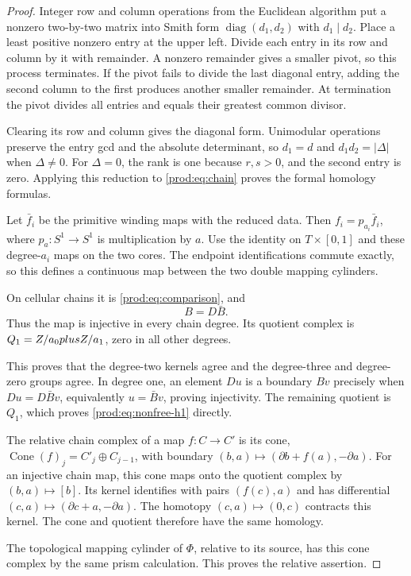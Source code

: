 \begin{proof}
Integer row and column operations from the Euclidean algorithm put a
nonzero two-by-two matrix into Smith form
$\operatorname{diag}(d_1,d_2)$ with $d_1\mid d_2$.
Place a least positive nonzero entry at the upper left.
Divide each entry in its row and column by it with remainder.
A nonzero remainder gives a smaller pivot, so this process terminates.
If the pivot fails to divide the last diagonal entry, adding the second
column to the first produces another smaller remainder.
At termination the pivot divides all entries and equals their greatest
common divisor.

Clearing its row and column gives the diagonal form.
Unimodular operations preserve the entry gcd and the absolute determinant,
so $d_1=d$ and $d_1d_2=|\Delta|$ when $\Delta\ne0$.
For $\Delta=0$, the rank is one because $r,s>0$, and the second
entry is zero.  Applying this reduction to \eqref{prod:eq:chain} proves
the formal homology formulas.

Let $\bar f_i$ be the primitive winding maps with the reduced data.
Then $f_i=p_{a_i}\bar f_i$, where
$p_a:S^1\to S^1$ is multiplication by $a$.
Use the identity on $T\times[0,1]$ and these degree-$a_i$ maps on
the two cores.  The endpoint identifications commute exactly, so this
defines a continuous map between the two double mapping cylinders.

On cellular chains it is \eqref{prod:eq:comparison}, and
\[
                         B=D\bar B.
\]
Thus the map is injective in every chain degree.
Its quotient complex is $Q_1=Z/a_0plusZ/a_1$, zero in all
other degrees.

This proves that the degree-two kernels agree and the
degree-three and degree-zero groups agree.
In degree one, an element $Du$ is a boundary $Bv$ precisely when
$Du=D\bar Bv$, equivalently $u=\bar Bv$, proving injectivity.
The remaining quotient is $Q_1$, which proves
\eqref{prod:eq:nonfree-h1} directly.

The relative chain complex of a map $f:C\to C'$ is its cone,
$\operatorname{Cone}(f)_j=C'_j\oplus C_{j-1}$, with boundary
$(b,a)\mapsto(\partial b+f(a),-\partial a)$.
For an injective chain map, this cone maps onto the quotient complex by
$(b,a)\mapsto[b]$.  Its kernel identifies with pairs $(f(c),a)$
and has differential $(c,a)\mapsto(\partial c+a,-\partial a)$.
The homotopy $(c,a)\mapsto(0,c)$ contracts this kernel.
The cone and quotient therefore have the same homology.

The topological mapping cylinder of $\Phi$, relative to its source,
has this cone complex by the same prism calculation.
This proves the relative assertion.
\end{proof}

